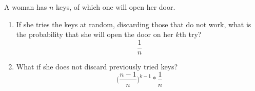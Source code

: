 \item A woman has $n$ keys, of which one will open her door.
\begin{enumerate}
    \item If she tries the keys at random, discarding those that do not work, what is the probability that she will open the door on her $k$th try?
    \[ \frac{1}{n} \]
    \item What if she does not discard previously tried keys?
    \[ \Big(\frac{n-1}{n}\Big)^{k-1} * \frac{1}{n} \]
\end{enumerate}